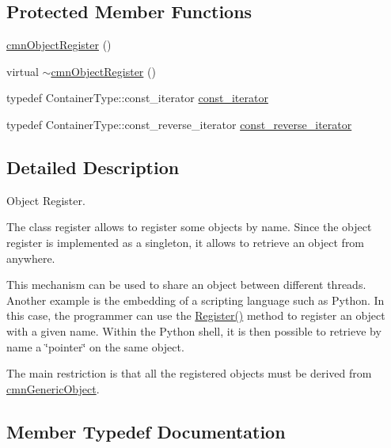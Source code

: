 \subsection*{Protected Member Functions}
\begin{DoxyCompactItemize}
\item 
\hyperlink{classcmn_object_register_a184065a86d3b7d16945c741774ddb1fd}{cmn\+Object\+Register} ()
\item 
virtual \hyperlink{classcmn_object_register_a62e20c711ded93c1163443d1cc0e6564}{$\sim$cmn\+Object\+Register} ()
\end{DoxyCompactItemize}
\begin{DoxyCompactItemize}
\item 
typedef Container\+Type\+::const\+\_\+iterator \hyperlink{classcmn_object_register_a660d73b1be5af069a8f09606a5819d2e}{const\+\_\+iterator}
\item 
typedef Container\+Type\+::const\+\_\+reverse\+\_\+iterator \hyperlink{classcmn_object_register_a950b9ecbe6287e932232dc5c172e5b1f}{const\+\_\+reverse\+\_\+iterator}
\end{DoxyCompactItemize}


\subsection{Detailed Description}
Object Register. 

The class register allows to register some objects by name. Since the object register is implemented as a singleton, it allows to retrieve an object from anywhere.

This mechanism can be used to share an object between different threads. Another example is the embedding of a scripting language such as Python. In this case, the programmer can use the \hyperlink{classcmn_object_register_a21c87771e997e5bca1a77133617abd00}{Register()} method to register an object with a given name. Within the Python shell, it is then possible to retrieve by name a \char`\"{}pointer\char`\"{} on the same object.

The main restriction is that all the registered objects must be derived from \hyperlink{classcmn_generic_object}{cmn\+Generic\+Object}. 

\subsection{Member Typedef Documentation}
\hypertarget{classcmn_object_register_a660d73b1be5af069a8f09606a5819d2e}{}
